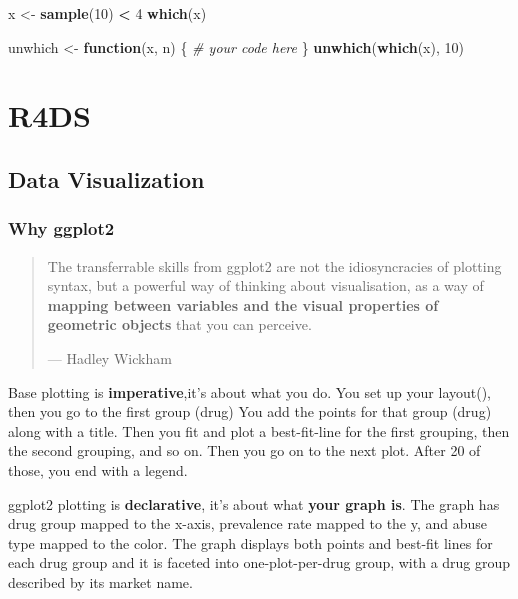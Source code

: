 \documentclass[]{book}
\newenvironment{Shaded}{\begin{snugshade}}{\end{snugshade}}
\newcommand{\CommentTok}[1]{\textcolor[rgb]{0.56,0.35,0.01}{\textit{#1}}}
\newcommand{\ControlFlowTok}[1]{\textcolor[rgb]{0.13,0.29,0.53}{\textbf{#1}}}
\newcommand{\DecValTok}[1]{\textcolor[rgb]{0.00,0.00,0.81}{#1}}
\newcommand{\KeywordTok}[1]{\textcolor[rgb]{0.13,0.29,0.53}{\textbf{#1}}}
\newcommand{\NormalTok}[1]{#1}
\newcommand{\OperatorTok}[1]{\textcolor[rgb]{0.81,0.36,0.00}{\textbf{#1}}}
\newcommand{\StringTok}[1]{\textcolor[rgb]{0.31,0.60,0.02}{#1}}
\theoremstyle{definition}
\theoremstyle{definition}
\theoremstyle{definition}
\theoremstyle{remark}
\begin{document}
\begin{Shaded}
\begin{Highlighting}[]
\NormalTok{x <-}\StringTok{ }\KeywordTok{sample}\NormalTok{(}\DecValTok{10}\NormalTok{) }\OperatorTok{<}\StringTok{ }\DecValTok{4}
\KeywordTok{which}\NormalTok{(x)}

\NormalTok{unwhich <-}\StringTok{ }\ControlFlowTok{function}\NormalTok{(x, n) \{}
  \CommentTok{# your code here}
\NormalTok{\}}
\KeywordTok{unwhich}\NormalTok{(}\KeywordTok{which}\NormalTok{(x), }\DecValTok{10}\NormalTok{)}
\end{Highlighting}
\end{Shaded}

\hypertarget{part-r4ds}{%
\part{R4DS}\label{part-r4ds}}

\hypertarget{data-visualization}{%
\chapter{Data Visualization}\label{data-visualization}}

\hypertarget{why-ggplot2}{%
\section{Why ggplot2}\label{why-ggplot2}}

\begin{quote}
The transferrable skills from ggplot2 are not the idiosyncracies of
plotting syntax, but a powerful way of thinking about visualisation, as
a way of \textbf{mapping between variables and the visual properties of
geometric objects} that you can perceive.

--- Hadley Wickham
\end{quote}

Base plotting is \textbf{imperative},it's about what you do. You set up
your layout(), then you go to the first group (drug) You add the points
for that group (drug) along with a title. Then you fit and plot a
best-fit-line for the first grouping, then the second grouping, and so
on. Then you go on to the next plot. After 20 of those, you end with a
legend.

ggplot2 plotting is \textbf{declarative}, it's about what \textbf{your
graph is}. The graph has drug group mapped to the x-axis, prevalence
rate mapped to the y, and abuse type mapped to the color. The graph
displays both points and best-fit lines for each drug group and it is
faceted into one-plot-per-drug group, with a drug group described by its
market name.
\end{document}
